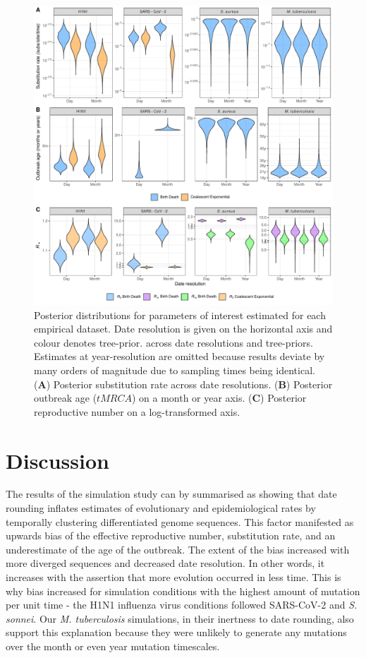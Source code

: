 \documentclass{article}
\begin{document}
\begin{spacing}{1.5}
\begin{figure}[h!]
    \centering
    \includegraphics[width=\textwidth]{empirical_parms.pdf}
    \caption{Posterior distributions for parameters of interest estimated for each empirical dataset. Date resolution is given on the horizontal axis and colour denotes tree-prior. across date resolutions and tree-priors. Estimates at year-resolution are omitted because results deviate by many orders of magnitude due to sampling times being identical. (\textbf{A}) Posterior substitution rate across date resolutions. (\textbf{B}) Posterior outbreak age ($tMRCA$) on a month or year axis.  (\textbf{C}) Posterior reproductive number on a log-transformed axis.}
    \label{fig:emp-parm}
\end{figure}

\section*{Discussion}

The results of the simulation study can by summarised as showing that date rounding inflates estimates of evolutionary and epidemiological rates by temporally clustering differentiated genome sequences. This factor manifested as upwards bias of the effective reproductive number, substitution rate, and an underestimate of the age of the outbreak. The extent of the bias increased with more diverged sequences and decreased date resolution. In other words, it increases with the assertion that more evolution occurred in less time. This is why bias increased for simulation conditions with the highest amount of mutation per unit time - the H1N1 influenza virus conditions followed SARS-CoV-2 and \textit{S. sonnei}. Our \textit{M. tuberculosis} simulations, in their inertness to date rounding, also support this explanation because they were unlikely to generate any mutations over the month or even year mutation timescales.


\end{spacing}
\end{document}

